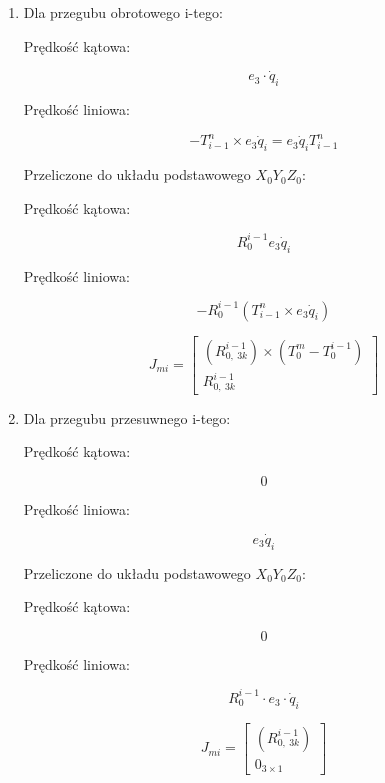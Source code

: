 \documentclass{article}
\newenvironment{kol2}{\noindent \begin{minipage}[t]{0.5\linewidth}}{\end{minipage}}
\begin{document}
\begin{enumerate}
    \item Dla przegubu obrotowego i-tego:

    \begin{kol2}
        Prędkość kątowa:

        $$  e_3 \cdot \dot{q}_i $$
    \end{kol2}
    \begin{kol2}
        Prędkość liniowa:

        $$  -T_{i-1}^n \times e_3 \dot{q}_i = e_3 \dot{q}_i T_{i-1}^n $$
    \end{kol2}

    Przeliczone do układu podstawowego $X_0Y_0Z_0$:

    \begin{kol2}
        Prędkość kątowa:

        $$  R_0^{i-1} e_3 \dot{q}_i $$
    \end{kol2}
    \begin{kol2}
        Prędkość liniowa:

        $$  -R_0^{i-1}(T_{i-1}^n \times e_3 \dot{q}_i ) $$
    \end{kol2}

    \Large
    $$  J_{mi} = \begin{bmatrix}
        (R_{0,\ 3k}^{i-1}) \times (T_0^m - T_0^{i-1}) \\
        R_{0,\ 3k}^{i-1}
        \end{bmatrix}
    $$
    \normalsize

    \item Dla przegubu przesuwnego i-tego:

    \begin{kol2}
        Prędkość kątowa:

        $$  0 $$
    \end{kol2}
    \begin{kol2}
        Prędkość liniowa:

        $$  e_3 \dot{q}_i $$
    \end{kol2}

    Przeliczone do układu podstawowego $X_0Y_0Z_0$:

    \begin{kol2}
        Prędkość kątowa:

        $$  0 $$
    \end{kol2}
    \begin{kol2}
        Prędkość liniowa:

        $$  R_0^{i-1} \cdot e_3 \cdot \dot{q}_i $$
    \end{kol2}

    \Large
    $$  J_{mi} = \begin{bmatrix}
        (R_{0,\ 3k}^{i-1}) \\
        0_{3\times 1}
        \end{bmatrix}
    $$
    \normalsize

\end{enumerate}
\end{document}
